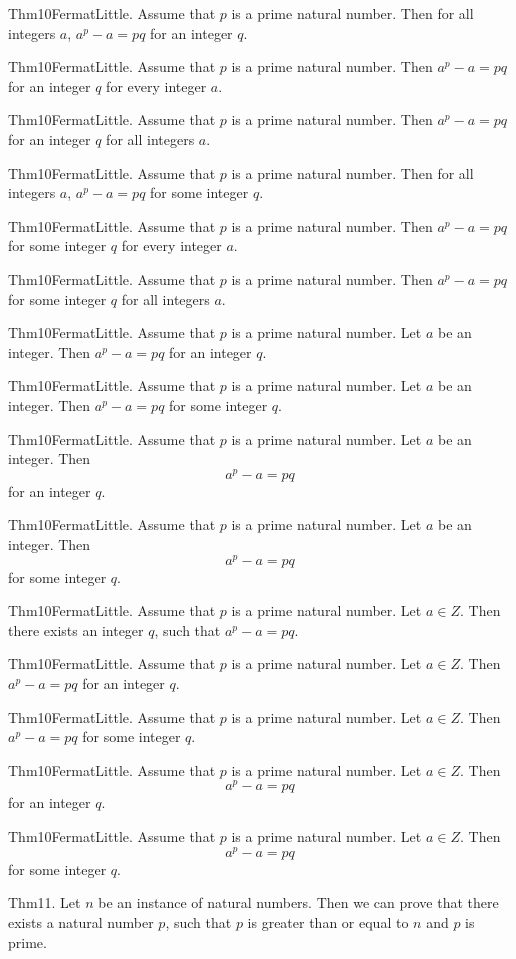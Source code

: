 \documentclass{article}
\begin{document}
Thm10FermatLittle. Assume that $p$ is a prime natural number. Then for all integers $a$, $a ^ {p}- a = p q$ for an integer $q$.

Thm10FermatLittle. Assume that $p$ is a prime natural number. Then $a ^ {p}- a = p q$ for an integer $q$ for every integer $a$.

Thm10FermatLittle. Assume that $p$ is a prime natural number. Then $a ^ {p}- a = p q$ for an integer $q$ for all integers $a$.

Thm10FermatLittle. Assume that $p$ is a prime natural number. Then for all integers $a$, $a ^ {p}- a = p q$ for some integer $q$.

Thm10FermatLittle. Assume that $p$ is a prime natural number. Then $a ^ {p}- a = p q$ for some integer $q$ for every integer $a$.

Thm10FermatLittle. Assume that $p$ is a prime natural number. Then $a ^ {p}- a = p q$ for some integer $q$ for all integers $a$.

Thm10FermatLittle. Assume that $p$ is a prime natural number. Let $a$ be an integer. Then $a ^ {p}- a = p q$ for an integer $q$.

Thm10FermatLittle. Assume that $p$ is a prime natural number. Let $a$ be an integer. Then $a ^ {p}- a = p q$ for some integer $q$.

Thm10FermatLittle. Assume that $p$ is a prime natural number. Let $a$ be an integer. Then $$a ^ {p}- a = p q$$ for an integer $q$.

Thm10FermatLittle. Assume that $p$ is a prime natural number. Let $a$ be an integer. Then $$a ^ {p}- a = p q$$ for some integer $q$.

Thm10FermatLittle. Assume that $p$ is a prime natural number. Let $a \in Z$. Then there exists an integer $q$, such that $a ^ {p}- a = p q$.

Thm10FermatLittle. Assume that $p$ is a prime natural number. Let $a \in Z$. Then $a ^ {p}- a = p q$ for an integer $q$.

Thm10FermatLittle. Assume that $p$ is a prime natural number. Let $a \in Z$. Then $a ^ {p}- a = p q$ for some integer $q$.

Thm10FermatLittle. Assume that $p$ is a prime natural number. Let $a \in Z$. Then $$a ^ {p}- a = p q$$ for an integer $q$.

Thm10FermatLittle. Assume that $p$ is a prime natural number. Let $a \in Z$. Then $$a ^ {p}- a = p q$$ for some integer $q$.

Thm11. Let $n$ be an instance of natural numbers. Then we can prove that there exists a natural number $p$, such that $p$ is greater than or equal to $n$ and $p$ is prime.
\end{document}
